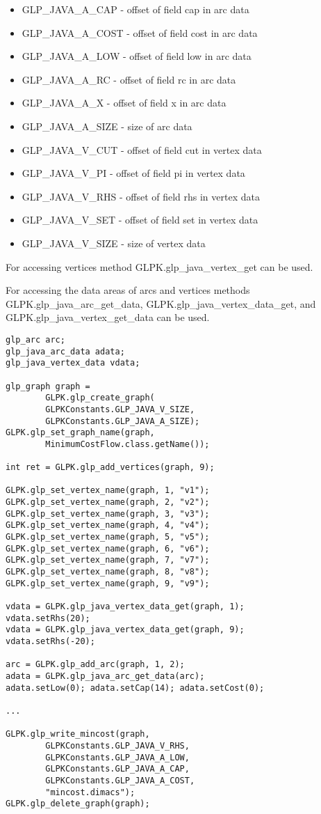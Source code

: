 \documentclass[a4paper,11pt]{report}
\begin{document}
\begin{itemize}
\item GLP\_JAVA\_A\_CAP  - offset of field cap in arc data
\item GLP\_JAVA\_A\_COST - offset of field cost in arc data
\item GLP\_JAVA\_A\_LOW  - offset of field low in arc data
\item GLP\_JAVA\_A\_RC   - offset of field rc in arc data
\item GLP\_JAVA\_A\_X    - offset of field x in arc data
\item GLP\_JAVA\_A\_SIZE - size of arc data
\item GLP\_JAVA\_V\_CUT  - offset of field cut in vertex data
\item GLP\_JAVA\_V\_PI   - offset of field pi in vertex data
\item GLP\_JAVA\_V\_RHS  - offset of field rhs in vertex data
\item GLP\_JAVA\_V\_SET  - offset of field set in vertex data
\item GLP\_JAVA\_V\_SIZE - size of vertex data
\end{itemize}

For accessing vertices method GLPK.glp\_java\_vertex\_get can be used.

For accessing the data areas of arcs and vertices methods
GLPK.glp\_java\_arc\_get\_data,\linebreak
GLPK.glp\_java\_vertex\_data\_get, and
GLPK.glp\_java\_vertex\_get\_data can be used.

\begin{lstlisting}
glp_arc arc;
glp_java_arc_data adata;
glp_java_vertex_data vdata;

glp_graph graph =
        GLPK.glp_create_graph(
        GLPKConstants.GLP_JAVA_V_SIZE,
        GLPKConstants.GLP_JAVA_A_SIZE);
GLPK.glp_set_graph_name(graph,
        MinimumCostFlow.class.getName());

int ret = GLPK.glp_add_vertices(graph, 9);

GLPK.glp_set_vertex_name(graph, 1, "v1");
GLPK.glp_set_vertex_name(graph, 2, "v2");
GLPK.glp_set_vertex_name(graph, 3, "v3");
GLPK.glp_set_vertex_name(graph, 4, "v4");
GLPK.glp_set_vertex_name(graph, 5, "v5");
GLPK.glp_set_vertex_name(graph, 6, "v6");
GLPK.glp_set_vertex_name(graph, 7, "v7");
GLPK.glp_set_vertex_name(graph, 8, "v8");
GLPK.glp_set_vertex_name(graph, 9, "v9");
           
vdata = GLPK.glp_java_vertex_data_get(graph, 1);
vdata.setRhs(20);
vdata = GLPK.glp_java_vertex_data_get(graph, 9);
vdata.setRhs(-20);
        
arc = GLPK.glp_add_arc(graph, 1, 2);
adata = GLPK.glp_java_arc_get_data(arc);
adata.setLow(0); adata.setCap(14); adata.setCost(0);

...

GLPK.glp_write_mincost(graph, 
        GLPKConstants.GLP_JAVA_V_RHS,
        GLPKConstants.GLP_JAVA_A_LOW,
        GLPKConstants.GLP_JAVA_A_CAP,
        GLPKConstants.GLP_JAVA_A_COST,
        "mincost.dimacs");
GLPK.glp_delete_graph(graph);

\end{lstlisting}
\end{document}
